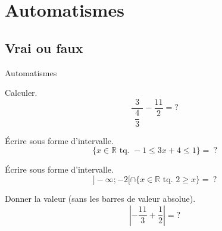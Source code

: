 \documentclass[14pt]{beamer}
\newcommand{\R}{\mathbb{R}}
\begin{document}
\section{Automatismes}

\subsection{Vrai ou faux}

\begin{frame}

\centering \huge
Automatismes

\end{frame}


\begin{frame}{1}
	Calculer.
	\[ \frac{\ \ 3\ \ }{\dfrac43} - \dfrac{11}{2} = ? \]
	
\end{frame}

\begin{frame}{2}

	Écrire sous forme d'intervalle.
		\[ \{ x \in \R \text{ tq. } -1 \leq 3x +4 \leq 1 \} = \ ? \]

\end{frame}

\begin{frame}{3}

	Écrire sous forme d'intervalle.
	\[ ]{-}\infty ; {-}2 [ \cap \{ x \in \R \text{ tq. } 2 \geq x \} = \ ? \]

\end{frame}


\begin{frame}{4}

	Donner la valeur (sans les barres de valeur absolue).
		\[ \left| -\dfrac{11}3 + \dfrac12 \right| = ?  \]

\end{frame}
\end{document}
